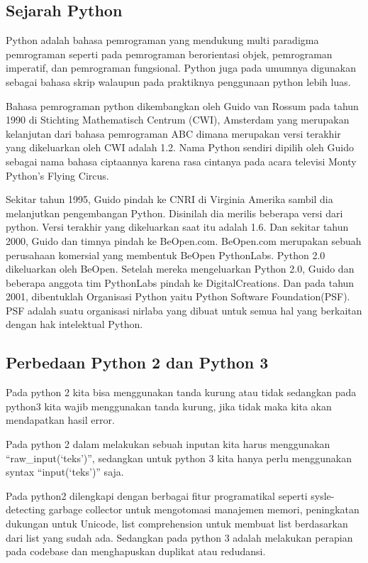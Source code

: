 \subsection{Sejarah Python}
Python adalah bahasa pemrograman yang mendukung multi paradigma pemrograman seperti pada pemrograman berorientasi objek, pemrograman imperatif, dan pemrograman fungsional. Python juga pada umumnya digunakan sebagai bahasa skrip walaupun pada praktiknya penggunaan python lebih luas. 

Bahasa pemrograman python dikembangkan oleh Guido van Rossum pada tahun 1990 di Stichting Mathematisch Centrum (CWI), Amsterdam yang merupakan kelanjutan dari bahasa pemrograman ABC dimana merupakan versi terakhir yang dikeluarkan oleh CWI adalah 1.2. Nama Python sendiri dipilih oleh Guido sebagai nama bahasa ciptaannya karena rasa cintanya pada acara televisi Monty Python’s Flying Circus.

Sekitar tahun 1995, Guido pindah ke CNRI di Virginia Amerika sambil dia melanjutkan pengembangan Python. Disinilah dia merilis beberapa versi dari python. Versi terakhir yang dikeluarkan saat itu adalah 1.6. Dan sekitar tahun 2000,  Guido dan timnya pindah ke BeOpen.com. BeOpen.com merupakan sebuah perusahaan komersial yang membentuk BeOpen PythonLabs. Python 2.0 dikeluarkan oleh BeOpen. Setelah mereka mengeluarkan Python 2.0, Guido dan beberapa anggota tim PythonLabs pindah ke DigitalCreations.
Dan pada tahun 2001, dibentuklah Organisasi Python yaitu Python Software  Foundation(PSF). PSF adalah suatu organisasi nirlaba yang dibuat untuk semua hal yang berkaitan dengan hak intelektual Python. 


\subsection{Perbedaan Python 2 dan Python 3}

Pada python 2 kita bisa menggunakan tanda kurung atau tidak sedangkan pada python3 kita wajib menggunakan tanda kurung, jika tidak maka kita akan mendapatkan hasil error.

Pada python 2 dalam melakukan sebuah inputan kita harus menggunakan “raw_input(‘teks’)”, sedangkan untuk python 3 kita hanya perlu menggunakan syntax “input(‘teks’)” saja.

Pada python2 dilengkapi dengan berbagai fitur programatikal seperti sysle-detecting garbage collector untuk mengotomasi manajemen memori, peningkatan dukungan untuk Unicode, list comprehension untuk membuat list berdasarkan dari list yang sudah ada. Sedangkan pada python 3 adalah melakukan perapian pada codebase dan menghapuskan duplikat atau redudansi.

